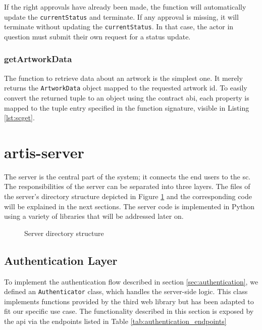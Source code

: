If the right approvals have already been made, the function will automatically update the \texttt{currentStatus} and terminate. If any approval is missing, it will terminate without updating the \texttt{currentStatus}. In that case, the actor in question must submit their own request for a status update.

\subsubsection{getArtworkData}
The function to retrieve data about an artwork is the simplest one. It merely returns the \texttt{ArtworkData} object mapped to the requested artwork \gls{id}. To easily convert the returned tuple to an object using the contract \gls{abi}, each property is mapped to the tuple entry specified in the function signature, visible in Listing \ref{lst:scget}.



\clearpage
\section{artis-server}
The server is the central part of the system; it connects the end users to the \gls{sc}. The responsibilities of the server can be separated into three layers. The files of the server's directory structure depicted in Figure \ref{fig:server_directory_structure} and the corresponding code will be explained in the next sections. The server code is implemented in Python using a variety of libraries that will be addressed later on.

\begin{figure}
    \centering
        
    \caption{Server directory structure}
    \label{fig:server_directory_structure}
\end{figure}

\subsection{Authentication Layer}
\label{sec:authentication_layer}
To implement the authentication flow described in section \ref{sec:authentication}, we defined an \texttt{Authenticator} class, which handles the server-side logic. This class implements functions provided by the third web library \cite{thirdweb} but has been adapted to fit our specific use case. The functionality described in this section is exposed by the \gls{api} via the endpoints listed in Table \ref{tab:authentication_endpoints}

